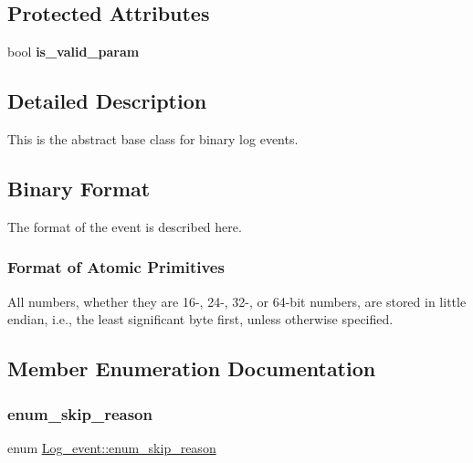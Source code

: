 \subsection*{Protected Attributes}
\begin{DoxyCompactItemize}
\item 
\mbox{\label{classLog__event_adfcb8aa94a960cc94556875b350489a8}} 
bool {\bfseries is\+\_\+valid\+\_\+param}
\end{DoxyCompactItemize}


\subsection{Detailed Description}
This is the abstract base class for binary log events.\hypertarget{classLog__event_Log_event_binary_format}{}\subsection{Binary Format}\label{classLog__event_Log_event_binary_format}
The format of the event is described here.\hypertarget{classLog__event_Log_event_format_of_atomic_primitives}{}\subsubsection{Format of Atomic Primitives}\label{classLog__event_Log_event_format_of_atomic_primitives}

\begin{DoxyItemize}
\item All numbers, whether they are 16-\/, 24-\/, 32-\/, or 64-\/bit numbers, are stored in little endian, i.\+e., the least significant byte first, unless otherwise specified. 
\end{DoxyItemize}

\subsection{Member Enumeration Documentation}
\mbox{\label{classLog__event_a44955437350a8b9039e32f019dfed40d}} 
\subsubsection{\texorpdfstring{enum\+\_\+skip\+\_\+reason}{enum\_skip\_reason}}
{\footnotesize\ttfamily enum \mbox{\hyperlink{classLog__event_a44955437350a8b9039e32f019dfed40d}{Log\+\_\+event\+::enum\+\_\+skip\+\_\+reason}}}

